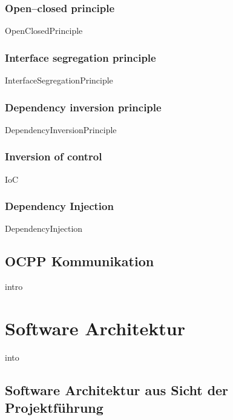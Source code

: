 \documentclass{article}
\begin{document}
        \subsubsection{Open–closed principle}
        \label{kap:OCP}
            {OpenClosedPrinciple}
        
        \subsubsection{Interface segregation principle}
        \label{kap:ISP}
            {InterfaceSegregationPrinciple}
                   
        \subsubsection{Dependency inversion principle}
        \label{kap:DIP}
            {DependencyInversionPrinciple}

        \subsubsection{Inversion of control}
        \label{kap:IoC}
            {IoC}

        \subsubsection{Dependency Injection}
        \label{DependencyInjection}
            {DependencyInjection}

    \subsection{OCPP Kommunikation}
        {intro}

\newpage

\section{Software Architektur}
    {into}

    \subsection{Software Architektur aus Sicht der Projektführung}
\end{document}
